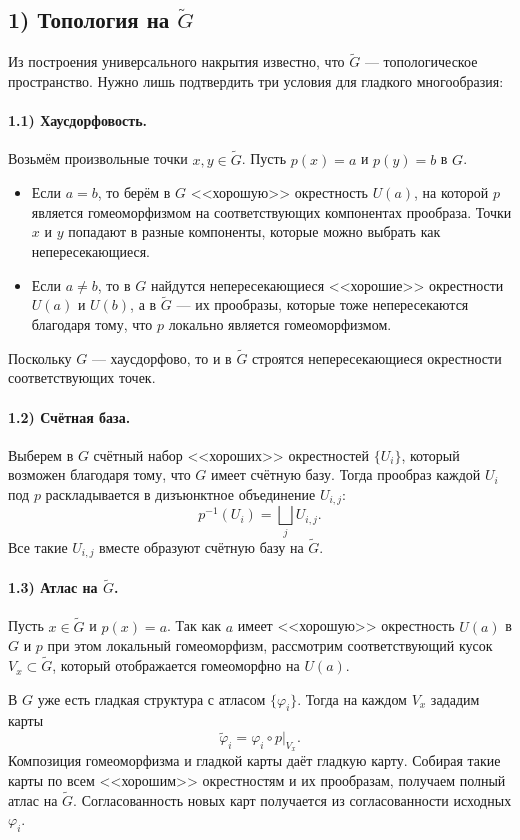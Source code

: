 \documentclass[12pt]{article}
\begin{document}
\begin{large}
\subsection*{1) Топология на $\widetilde{G}$}
Из построения универсального накрытия известно, что $\widetilde{G}$ --- топологическое пространство. Нужно лишь подтвердить три условия для гладкого многообразия:

\paragraph{1.1) Хаусдорфовость.}
Возьмём произвольные точки $x,y \in \widetilde{G}$. Пусть $p(x)=a$ и $p(y)=b$ в $G$.
\begin{itemize}
\item Если $a=b$, то берём в $G$ <<хорошую>> окрестность $U(a)$, на которой $p$ является гомеоморфизмом на соответствующих компонентах прообраза. Точки $x$ и $y$ попадают в разные компоненты, которые можно выбрать как непересекающиеся.
\item Если $a \neq b$, то в $G$ найдутся непересекающиеся <<хорошие>> окрестности $U(a)$ и $U(b)$, а в $\widetilde{G}$ --- их прообразы, которые тоже непересекаются благодаря тому, что $p$ локально является гомеоморфизмом.
\end{itemize}
Поскольку $G$ --- хаусдорфово, то и в $\widetilde{G}$ строятся непересекающиеся окрестности соответствующих точек.

\paragraph{1.2) Счётная база.}
Выберем в $G$ счётный набор <<хороших>> окрестностей $\{U_i\}$, который возможен благодаря тому, что $G$ имеет счётную базу. Тогда прообраз каждой $U_i$ под $p$ раскладывается в дизъюнктное объединение $U_{i,j}$:
\[
p^{-1}(U_i) = \bigsqcup_j U_{i,j}.
\]
Все такие $U_{i,j}$ вместе образуют счётную базу на $\widetilde{G}$.

\paragraph{1.3) Атлас на $\widetilde{G}$.}
Пусть $x \in \widetilde{G}$ и $p(x)=a$. Так как $a$ имеет <<хорошую>> окрестность $U(a)$ в $G$ и $p$ при этом локальный гомеоморфизм, рассмотрим соответствующий кусок $V_x \subset \widetilde{G}$, который отображается гомеоморфно на $U(a)$.

В $G$ уже есть гладкая структура с атласом $\{\varphi_i\}$. Тогда на каждом $V_x$ зададим карты
\[
\widetilde{\varphi}_i = \varphi_i \circ p \bigl|_{V_x}.
\]
Композиция гомеоморфизма и гладкой карты даёт гладкую карту. Собирая такие карты по всем <<хорошим>> окрестностям и их прообразам, получаем полный атлас на $\widetilde{G}$. Согласованность новых карт получается из согласованности исходных $\varphi_i$.


\end{large}
\end{document}
